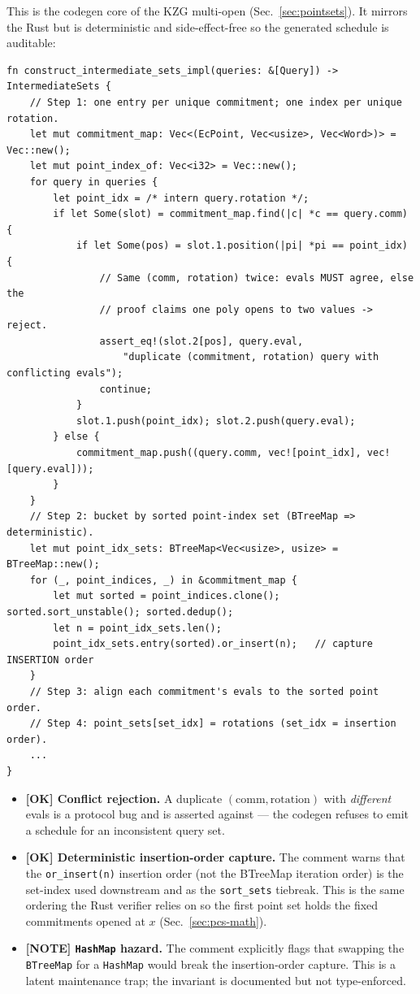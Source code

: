 This is the codegen core of the KZG multi-open (Sec.~\ref{sec:pointsets}).
It mirrors the Rust  but is
deterministic and side-effect-free so the generated schedule is auditable:
\begin{lstlisting}[style=rust]
fn construct_intermediate_sets_impl(queries: &[Query]) -> IntermediateSets {
    // Step 1: one entry per unique commitment; one index per unique rotation.
    let mut commitment_map: Vec<(EcPoint, Vec<usize>, Vec<Word>)> = Vec::new();
    let mut point_index_of: Vec<i32> = Vec::new();
    for query in queries {
        let point_idx = /* intern query.rotation */;
        if let Some(slot) = commitment_map.find(|c| *c == query.comm) {
            if let Some(pos) = slot.1.position(|pi| *pi == point_idx) {
                // Same (comm, rotation) twice: evals MUST agree, else the
                // proof claims one poly opens to two values -> reject.
                assert_eq!(slot.2[pos], query.eval,
                    "duplicate (commitment, rotation) query with conflicting evals");
                continue;
            }
            slot.1.push(point_idx); slot.2.push(query.eval);
        } else {
            commitment_map.push((query.comm, vec![point_idx], vec![query.eval]));
        }
    }
    // Step 2: bucket by sorted point-index set (BTreeMap => deterministic).
    let mut point_idx_sets: BTreeMap<Vec<usize>, usize> = BTreeMap::new();
    for (_, point_indices, _) in &commitment_map {
        let mut sorted = point_indices.clone(); sorted.sort_unstable(); sorted.dedup();
        let n = point_idx_sets.len();
        point_idx_sets.entry(sorted).or_insert(n);   // capture INSERTION order
    }
    // Step 3: align each commitment's evals to the sorted point order.
    // Step 4: point_sets[set_idx] = rotations (set_idx = insertion order).
    ...
}
\end{lstlisting}
\begin{itemize}
  \item \textcolor{tracegreen}{\textbf{[OK] Conflict rejection.}} A
        duplicate $(\text{comm},\text{rotation})$ with \emph{different}
        evals is a protocol bug and is asserted against --- the codegen
        refuses to emit a schedule for an inconsistent query set.
  \item \textcolor{tracegreen}{\textbf{[OK] Deterministic insertion-order
        capture.}} The comment warns that the \texttt{or\_insert(n)}
        insertion order (not the BTreeMap iteration order) is the
        set-index used downstream and as the \texttt{sort\_sets}
        tiebreak. This is the same ordering the Rust verifier relies on
        so the first point set holds the fixed commitments opened at
        $x$ (Sec.~\ref{sec:pcs-math}).
  \item \textcolor{mathpurple}{\textbf{[NOTE] \texttt{HashMap} hazard.}}
        The comment explicitly flags that swapping the \texttt{BTreeMap}
        for a \texttt{HashMap} would break the insertion-order capture.
        This is a latent maintenance trap; the invariant is documented
        but not type-enforced.
\end{itemize}

